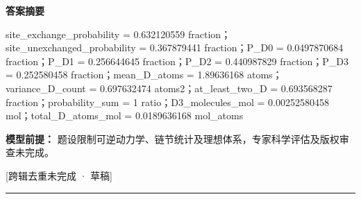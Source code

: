 \documentclass[UTF8,11pt,a4paper]{ctexart}
\begin{document}
\noindent\textbf{答案摘要}\par
site\_exchange\_probability = 0.632120559 fraction；site\_unexchanged\_probability = 0.367879441 fraction；P\_D0 = 0.0497870684 fraction；P\_D1 = 0.256644645 fraction；P\_D2 = 0.440987829 fraction；P\_D3 = 0.252580458 fraction；mean\_D\_atoms = 1.89636168 atoms；variance\_D\_count = 0.697632474 atoms2；at\_least\_two\_D = 0.693568287 fraction；probability\_sum = 1 ratio；D3\_molecules\_mol = 0.00252580458 mol；total\_D\_atoms\_mol = 0.0189636168 mol\_atoms\par
\noindent\textbf{模型前提：}
题设限制可逆动力学、链节统计及理想体系，专家科学评估及版权审查未完成。\par
\noindent\textcolor{red!65!black}{[跨辑去重未完成 · 草稿]} \par
\medskip\hrule\medskip
{}
\end{document}
